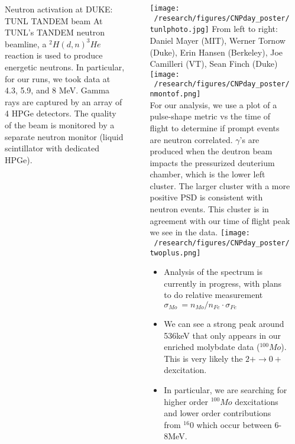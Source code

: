 \documentclass[final]{beamer}
\newlength{\sepwidth}
\newlength{\colwidth}
\newcommand{\separatorcolumn}{\begin{column}{\sepwidth}\end{column}}
\begin{document}
\begin{frame}[t]
\begin{columns}[t]
\begin{column}{\colwidth}
\begin{block}{Neutron activation at DUKE: TUNL TANDEM beam}
  At TUNL's TANDEM neutron beamline, a $^2 H(d,n)^3 He$ reaction is used to produce energetic neutrons. In particular, for our runs, we took data at 4.3, 5.9, and 8 MeV. Gamma rays are captured by an array of 4 HPGe detectors. The quality of the beam is monitored by a separate neutron monitor (liquid scintillator with dedicated HPGe).



 
  \end{block}

  

  

\end{column}

\separatorcolumn

\begin{column}{\colwidth}
      \vspace{5cm}
      
      \texttt{[image: ~/research/figures/CNPday\_poster/tunlphoto.jpg]}
      {\footnotesize From left to right: Daniel Mayer (MIT), Werner Tornow (Duke), Erin Hansen (Berkeley), Joe Camilleri (VT), Sean Finch (Duke)}
      \texttt{[image: ~/research/figures/CNPday\_poster/nmontof.png]}
     \\
      For our analysis, we use a plot of a pulse-shape metric vs the time of flight to determine if prompt events are neutron correlated. $\gamma$'s are produced when the deutron beam impacts the pressurized deuterium chamber, which is the lower left cluster. The larger cluster with a more positive PSD is consistent with neutron events. This cluster is in agreement with our time of flight peak we see in the data.
      \texttt{[image: ~/research/figures/CNPday\_poster/twoplus.png]}
      \begin{itemize}
      \item Analysis of the spectrum is currently in progress, with plans to do relative measurement $\sigma_{Mo} \ =  n_{Mo} / n_{Fe} \cdot\sigma_{Fe}$
      \item We can see a strong peak around 536keV that only appears in our enriched molybdate data ($^{100} Mo$). This is very likely the \textbf{$2+\rightarrow 0+$} dexcitation.
      \item In particular, we are searching for higher order $^{100}Mo$ dexcitations and lower order contributions from $^{16}0$ which occur between 6-8MeV.
      \end{itemize}

  




\end{column}

\separatorcolumn
\end{columns}
\end{frame}
\end{document}
